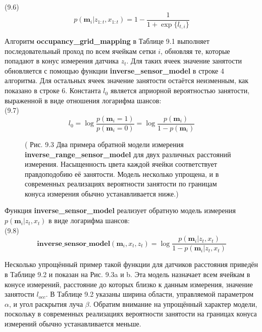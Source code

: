 \documentclass[10pt,a4paper]{article}
\begin{document}
(9.6)
$$p(\textbf{m}_i|z_{1:t},x_{1:t})=1-\frac{1}{1+\exp\{l_{t,i}\}}$$
 
Алгоритм \textbf{occupancy\_grid\_mapping} в Таблице 9.1 выполняет последовательный проход по всем ячейкам сетки $i$, обновляя те, которые попадают в конус измерения датчика $z_t$. Для таких ячеек значение занятости обновляется с помощью функции \textbf{inverse\_sensor\_model} в строке 4 алгоритма. Для остальных ячеек значение занятости остаётся неизменным, как показано в строке 6. Константа $l_0$ является априорной вероятностью занятости, выраженной в виде отношения логарифма шансов:\\

(9.7)
$$l_0=\log\frac{p(\textbf{m}_i=1)}{p(\textbf{m}_i=0)}=\log\frac{p(\textbf{m}_i)}{1-p(\textbf{m}_i)}$$

\begin{figure}[H]
	\caption{ ( Рис. 9.3 Два примера обратной модели измерения \textbf{inverse\_range\_sensor\_model} для двух различных расстояний измерения. Насыщенность цвета каждой ячейки соответствует правдоподобию её занятости. Модель несколько упрощена, и в современных реализациях вероятности занятости по границам конуса измерения обычно устанавливается ниже.)}
	\label{fig:93orig}
\end{figure}

Функция \textbf{inverse\_sensor\_model} реализует обратную модель измерения $p(\textbf{m}_i | z_t, x_t)$ в виде логарифма шансов:\\

(9.8)
$$\textbf{inverse\_sensor\_model}(\textbf{m}_i,x_t,z_t)=\log\frac{p(\textbf{m}_i|z_t,x_t)}{1-p(\textbf{m}_i|z_t,x_t)}$$

Несколько упрощённый пример такой функции для датчиков расстояния приведён в Таблице 9.2 и показан на Рис. 9.3a и b. Эта модель назначает всем ячейкам в конусе измерений, расстояние до которых близко к данным измерения, значение занятости $l_{occ}$. В Таблице 9.2 указаны ширина области, управляемой параметром $\alpha$, и угол раскрытия луча $\beta$. Обратим внимание на упрощённый характер модели, поскольку в современных реализациях вероятности занятости на границах конуса измерений обычно устанавливается меньше.
\end{document}
